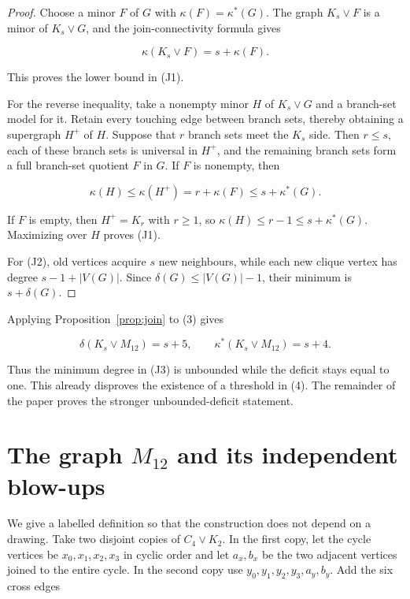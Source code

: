 \documentclass[11pt]{article}
\begin{document}
\begin{proof}

Choose a minor $F$ of $G$ with $\kappa(F)=\kappa^*(G)$. The graph
$K_s\vee F$ is a minor of $K_s\vee G$, and the join-connectivity formula gives

\nopagebreak[4]
\[
\kappa(K_s\vee F)=s+\kappa(F).
\]

This proves the lower bound in (J1).

For the reverse inequality, take a nonempty minor $H$ of $K_s\vee G$ and a
branch-set model for it. Retain every touching edge between branch sets, thereby
obtaining a supergraph $H^+$ of $H$. Suppose that $r$ branch sets meet the
$K_s$ side. Then $r\leq s$, each of these branch sets is universal in $H^+$,
and the remaining branch sets form a full branch-set quotient $F$ in $G$. If
$F$ is nonempty, then

\nopagebreak[4]
\[
\kappa(H)\leq\kappa(H^+)
=r+\kappa(F)
\leq s+\kappa^*(G).
\]

If $F$ is empty, then $H^+=K_r$ with $r\geq1$, so
$\kappa(H)\leq r-1\leq s+\kappa^*(G)$. Maximizing over $H$ proves (J1).

For (J2), old vertices acquire $s$ new neighbours, while each new clique vertex
has degree $s-1+|V(G)|$. Since $\delta(G)\leq|V(G)|-1$, their minimum is
$s+\delta(G)$.
\end{proof}


Applying Proposition~\ref{prop:join} to (3) gives

\nopagebreak[4]
\[
\delta(K_s\vee M_{12})=s+5,
\qquad
\kappa^*(K_s\vee M_{12})=s+4.                              \tag{J3}
\]

Thus the minimum degree in (J3) is unbounded while the deficit stays equal to
one. This already disproves the existence of a threshold in (4). The remainder
of the paper proves the stronger unbounded-deficit statement.

\section{The graph \texorpdfstring{$M_{12}$}{M12} and its independent blow-ups}


We give a labelled definition so that the construction does not depend on a
drawing. Take two disjoint copies of $C_4\vee K_2$. In the first copy, let the
cycle vertices be $x_0,x_1,x_2,x_3$ in cyclic order and let $a_x,b_x$ be the
two adjacent vertices joined to the entire cycle. In the second copy use
$y_0,y_1,y_2,y_3,a_y,b_y$. Add the six cross edges
\end{document}
